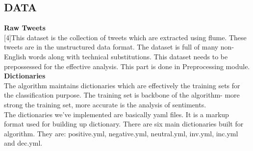 \documentclass[a4paper,12pt]{report}
\begin{document}
\subsection{DATA}
\textbf{Raw Tweets}\\
\hspace*{\parindent}	[4]This dataset is the collection of tweets which are extracted using flume. These tweets are in the unstructured data format. The dataset is full of many non-English words along with technical substitutions. This dataset needs to be prepossessed for the effective analysis. This part is done in Preprocessing module.\\
\hspace*{\parindent}\textbf{Dictionaries }\\
\hspace*{\parindent}	The algorithm maintains dictionaries which are effectively the training sets for the classification purpose. The training set is backbone of the algorithm- more strong the training set, more accurate is the analysis of sentiments.\\
\hspace*{\parindent} The dictionaries we’ve implemented are basically yaml files. It is a markup format used for building up dictionary. There are six main dictionaries built for algorithm. They are:
positive.yml, negative.yml, neutral.yml, inv.yml, inc.yml and dec.yml.
\end{document}
